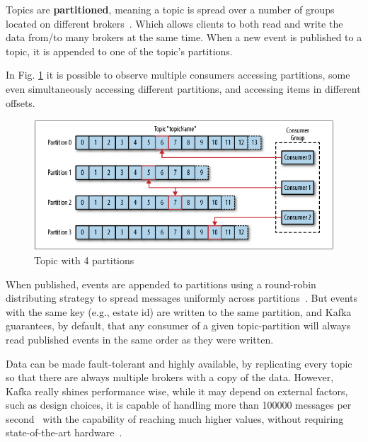 Topics are \textbf{partitioned}, meaning a topic is spread over a number of groups located on different brokers~\cite{Kreps2011KafkaA}. Which allows clients to both read and write the data from/to many brokers at the same time. When a new event is published to a topic, it is appended to one of the topic's partitions. 

In Fig. \ref{fig:kafka-topic-partitions} it is possible to observe multiple consumers accessing partitions, some even simultaneously accessing different partitions, and accessing items in different offsets.

\begin{figure}[h]
    \centering
    \includegraphics[width=1\textwidth,clip,trim=0 0 0 0]{Chapters/img/2_background/kafka-partitions.png}
    \caption{Topic with 4 partitions~\cite{kafka-partition-figure}} 
    \label{fig:kafka-topic-partitions}
\end{figure}

When published, events are appended to partitions using a round-robin distributing strategy to spread messages uniformly across partitions~\cite{Kreps2011KafkaA}. But events with the same key (e.g., estate id) are written to the same partition, and Kafka guarantees, by default, that any consumer of a given topic-partition will always read published events in the same order as they were written.

Data can be made fault-tolerant and highly available, by replicating every topic so that there are always multiple brokers with a copy of the data. However, Kafka really shines performance wise, while it may depend on external factors, such as design choices, it is capable of handling more than 100000 messages per second~\cite{kafka-thousand-requests} with the capability of reaching much higher values, without requiring state-of-the-art hardware~\cite{kafka-cheap-hardware}.


